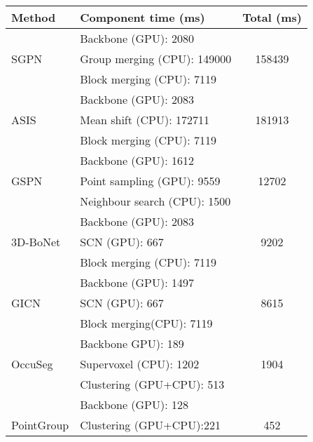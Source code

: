 \documentclass[10pt,twocolumn,letterpaper]{article}
\begin{document}
	\begin{table}[]
		\small
		\centering
		\setlength{\tabcolsep}{4pt}
		\begin{tabular}{llc@{}} \toprule
			Method     & Component time (ms)                    & Total   (ms) \\ \midrule
			& Backbone   (GPU): 2080                   &              \\
			SGPN \cite{wang2018sgpn}      & Group   merging (CPU): 149000            & 158439       \\
			& Block   merging (CPU): 7119              &              \\  \midrule
			& Backbone   (GPU): 2083                   &              \\
			ASIS \cite{wang2019associatively}      & Mean   shift (CPU): 172711               & 181913       \\
			& Block   merging (CPU): 7119              &              \\  \midrule
			& Backbone   (GPU): 1612                   &              \\
			GSPN \cite{yi2019gspn}      & Point   sampling (GPU): 9559             & 12702        \\
			& Neighbour   search (CPU): 1500           &              \\  \midrule
			& Backbone   (GPU): 2083                   &              \\
			3D-BoNet \cite{yang2019learning}   & SCN   (GPU): 667                         & 9202         \\
			& Block   merging (CPU): 7119              &              \\  \midrule
			& Backbone   (GPU): 1497                   &              \\
			GICN \cite{liu2020learning}      & SCN   (GPU): 667                         & 8615         \\
			& Block   merging(CPU): 7119               &              \\  \midrule
			& Backbone   GPU): 189                     &              \\
			OccuSeg \cite{han2020occuseg}   & Supervoxel   (CPU): 1202                 & 1904         \\
			& Clustering   (GPU+CPU): 513              &              \\  \midrule
			& Backbone   (GPU): 128                    &              \\
			PointGroup \cite{jiang2020pointgroup} & Clustering   (GPU+CPU):221               & 452          \\

\end{tabular}
\end{table}
\end{document}
